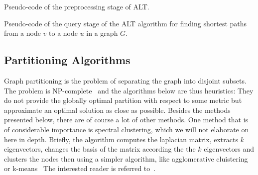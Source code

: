             
            \begin{algorithm}[htp]
                \hrulealg
            \caption{Pseudo-code of the preprocessing stage of ALT.}\label{alt-pre}
            \end{algorithm}
            \begin{algorithm}[htp]
                \hrulealg
            \caption{Pseudo-code of the query stage of the ALT algorithm for finding shortest paths from a node $v$ to a node $u$ in a graph $G$.}\label{alt-query}
            \end{algorithm}
            
        \subsection{Partitioning Algorithms} 
            Graph partitioning is the problem of separating the graph into disjoint subsets. 
            The problem is NP-complete~\autocite{andreev2006balanced} and the algorithms below are thus heuristics: 
            They do not provide the globally optimal partition with respect to some metric but approximate an optimal solution as close as possible.
            Besides the methods presented below, there are of course a lot of other methods.
            One method that is of considerable importance is spectral clustering, which we will not elaborate on here in depth.
            Briefly, the algorithm computes the laplacian matrix, extracts $k$ eigenvectors, changes the basis of the matrix according the the $k$ eigenvectors and clusters the nodes then using a simpler algorithm, like agglomerative cluistering~\autocite{hac} or k-means~\autocite{lloyd1982least}
            The interested reader is referred to~\autocite{spectral, uvl, ng}.
            
